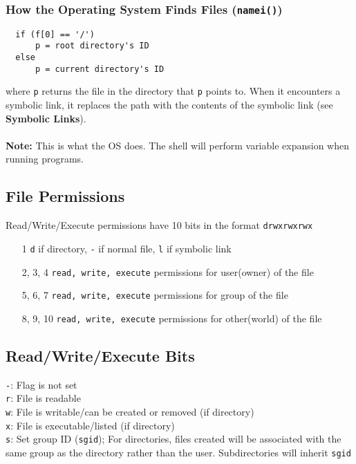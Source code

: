 \documentclass[13pt]{article}
\begin{document}
\subsubsection{How the Operating System Finds Files (\texttt{namei()})}
\begin{verbatim}
  if (f[0] == '/')
      p = root directory's ID
  else
      p = current directory's ID \end{verbatim}
    where \texttt{p} returns the file in the directory that \texttt{p} points to. When it encounters a symbolic link, it replaces the path with the contents of the symbolic link (see \textbf{Symbolic Links}). \\ \\
    \textbf{Note:} This is what the OS does. The shell will perform variable expansion when running programs.

    \subsection{File Permissions}
    Read/Write/Execute permissions have 10 bits in the format \texttt{drwxrwxrwx}
    \begin{itemize}[leftmargin = 0pt]
    \item [1] \texttt{d} if directory, \texttt{-} if normal file, \texttt{l} if symbolic link
    \item [2, 3, 4] \texttt{read, write, execute} permissions for user(owner) of the file
    \item [5, 6, 7] \texttt{read, write, execute} permissions for group of the file
    \item [8, 9, 10] \texttt{read, write, execute} permissions for other(world) of the file
    \end{itemize}

    \subsection{Read/Write/Execute Bits}
    \texttt{-}: Flag is not set \\
    \texttt{r}: File is readable \\
    \texttt{w}: File is writable/can be created or removed (if directory) \\
    \texttt{x}: File is executable/listed (if directory) \\
    \texttt{s}: Set group ID (\texttt{sgid}); For directories, files created will be associated with the same group as the directory rather than the user. Subdirectories will inherit \texttt{sgid} 
    
\end{document}
